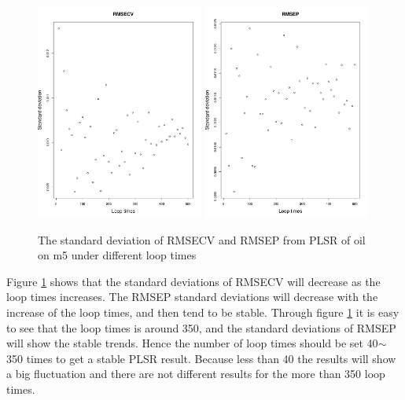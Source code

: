 \documentclass[a4paper,12pt,titlepage]{article} %
\numberwithin{equation}{section}  %
\begin{document}
	 
	\begin{figure}[]    %
		\centering           %
		\includegraphics[width=5.5cm, angle=0]{sd_RMSECV_loop_times_500.pdf}  %
		\includegraphics[width=5.5cm, angle=0]{sd_RMSEP_loop_times_500.pdf} %
		\caption{The standard deviation of RMSECV and RMSEP from PLSR of oil on m5 under different loop times}          %
		\label{fig:sd_RMSECV_loop_times_500}               %
	\end{figure}                        %
	
	
	Figure \ref{fig:sd_RMSECV_loop_times_500} shows that the standard deviations of RMSECV will decrease as the loop times increases. The RMSEP standard deviations will decrease with the increase of the loop times, and then tend to be stable. Through figure \ref{fig:sd_RMSECV_loop_times_500} it is easy to see that the loop times is around 350, and the standard deviations of RMSEP will show the stable trends. Hence the number of loop times should be set 40$\sim$350 times to get a stable PLSR result. Because less than 40 the results will show a big fluctuation and there are not different results for the more than 350 loop times.
	
\end{document}
